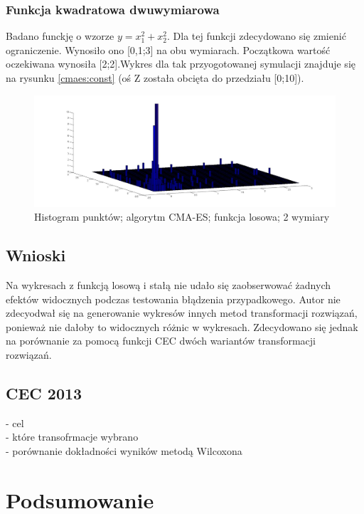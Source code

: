 \documentclass{mini}
\begin{document}
\subsubsection*{Funkcja kwadratowa dwuwymiarowa}
Badano funckję o wzorze $y=x_1^2+x_2^2$. Dla tej funkcji zdecydowano się zmienić ograniczenie. Wynosiło ono [0,1;3] na obu wymiarach. Początkowa wartość oczekiwana wynosiła [2;2].Wykres dla tak przyogotowanej symulacji znajduje się na rysunku \ref{cmaes:const} (oś Z została obcięta do przedziału [0;10]).

\begin{figure}[H]
\centering
\includegraphics[width=\textwidth]{cmaes-x2dim2-boundaries-v2}
\caption{Histogram punktów; algorytm CMA-ES; funkcja losowa; 2 wymiary}
\label{cmaes:x2}
\end{figure}

\subsection{Wnioski}
Na wykresach z funkcją losową i stałą nie udało się zaobserwować żadnych efektów widocznych podczas testowania błądzenia przypadkowego. Autor nie zdecyodwał się na generowanie wykresów innych metod transformacji rozwiązań, ponieważ nie dałoby to widocznych różnic w wykresach. Zdecydowano się jednak na porównanie za pomocą funkcji CEC dwóch wariantów transformacji rozwiązań.

\subsection{CEC 2013}
- cel\\
- które transofrmacje wybrano\\
- porównanie dokładności wyników metodą Wilcoxona

\pagebreak

\section{Podsumowanie}
\end{document}
